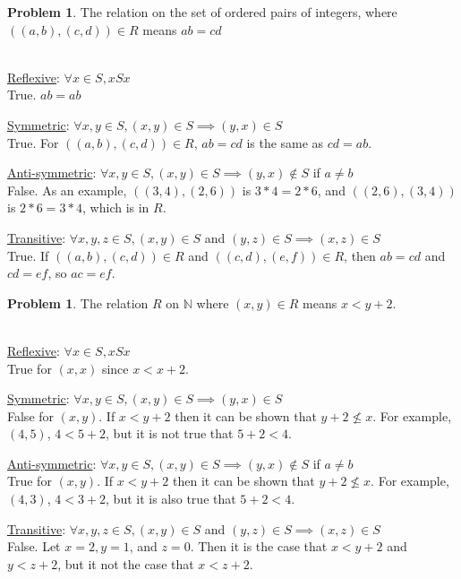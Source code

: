 \documentclass[10pt,leqno ]{article}
\theoremstyle{definition}
\newtheorem{problem}[theorem]{Problem}
\begin{document}
\begin{problem} The relation on the set of ordered pairs of integers, where $((a, b),(c, d))  \in R$ means $ab=cd$
\\\\
\Large
\item \underline{Reflexive}: $\forall x \in S, x S x$\\
True.  $ab = ab$\\
\item \underline{Symmetric}: $\forall x,y \in S, (x, y) \in S \implies (y, x) \in S$\\
True.  For $((a, b), (c, d)) \in R$, $ab = cd$ is the same as $cd = ab$.\\
\item \underline{Anti-symmetric}: $\forall x,y \in S, (x, y) \in S \implies (y, x) \notin S$ if $a \neq b$\\
False.  As an example, $((3, 4), (2, 6))$  is  $3 * 4 = 2 * 6$, and $((2, 6), (3, 4))$ is $2 * 6 = 3 * 4$, which is in $R$.\\
\item \underline{Transitive}: $\forall x,y,z \in S, (x, y) \in S$ and $(y, z) \in S \implies (x, z) \in S$\\
True.  If $((a, b),(c, d))  \in R$ and $((c, d), (e, f))  \in R$, then $ab = cd$ and $cd = ef$, so $ac = ef$.
\end{problem}
\newpage

\begin{problem} The relation $R$ on $\mathbb{N}$ where $(x, y) \in R$ means $x < y+ 2$.
\\\\
\Large
\item \underline{Reflexive}: $\forall x \in S, x S x$\\
True for $(x, x)$ since $ x < x + 2$.\\
\item \underline{Symmetric}: $\forall x,y \in S, (x, y) \in S \implies (y, x) \in S$\\
False for $(x, y)$.  If $x < y + 2$ then it can be shown that $y + 2 \nleq x$.  For example, $(4, 5)$, $ 4 < 5 + 2$, but it is not true that $5 + 2 < 4$.\\  
\item \underline{Anti-symmetric}: $\forall x,y \in S, (x, y) \in S \implies (y, x) \notin S$ if $a \neq b$\\
True for $(x, y)$.  If $x < y + 2$ then it can be shown that $y + 2 \nleq x$.  For example, $(4, 3)$, $ 4 < 3 + 2$, but it is also true that $5 + 2 < 4$.\\
\item \underline{Transitive}: $\forall x,y,z \in S, (x, y) \in S$ and $(y, z) \in S \implies (x, z) \in S$\\
False. Let $x = 2, y = 1$, and $z = 0.$  Then it is the case that $x < y + 2$ and $y < z + 2$, but it not the case that $x < z + 2$.
\end{problem}
\newpage
\end{document}
